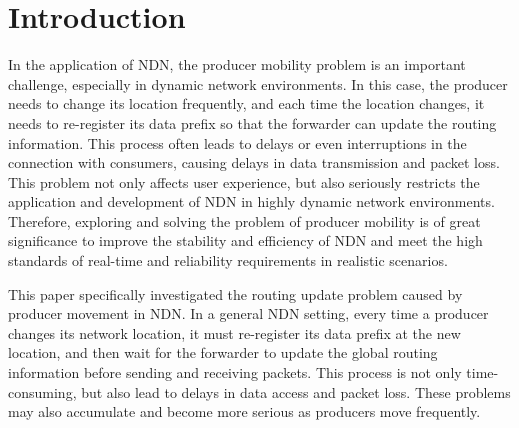 \documentclass[conference]{IEEEtran}
\begin{document}
\section{Introduction}
%

In the application of NDN, the producer mobility problem is an important challenge, especially in dynamic network environments. In this case, the producer needs to change its location frequently, and each time the location changes, it needs to re-register its data prefix so that the forwarder can update the routing information. This process often leads to delays or even interruptions in the connection with consumers, causing delays in data transmission and packet loss. This problem not only affects user experience, but also seriously restricts the application and development of NDN in highly dynamic network environments. Therefore, exploring and solving the problem of producer mobility is of great significance to improve the stability and efficiency of NDN and meet the high standards of real-time and reliability requirements in realistic scenarios.


This paper specifically investigated the routing update problem caused by producer movement in NDN. In a general NDN setting, every time a producer changes its network location, it must re-register its data prefix at the new location, and then wait for the forwarder to update the global routing information before sending and receiving packets. This process is not only time-consuming, but also lead to delays in data access and packet loss. These problems may also accumulate and become more serious as producers move frequently.
\end{document}
